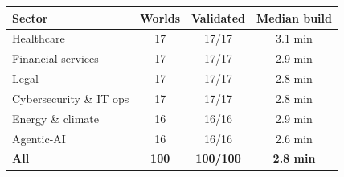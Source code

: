 \begin{tabular}{lccc}
\toprule
Sector & Worlds & Validated & Median build \\
\midrule
Healthcare & 17 & 17/17 & 3.1 min \\
Financial services & 17 & 17/17 & 2.9 min \\
Legal & 17 & 17/17 & 2.8 min \\
Cybersecurity \& IT ops & 17 & 17/17 & 2.8 min \\
Energy \& climate & 16 & 16/16 & 2.9 min \\
Agentic-AI & 16 & 16/16 & 2.6 min \\
\midrule
\textbf{All} & \textbf{100} & \textbf{100/100} & \textbf{2.8 min} \\
\bottomrule
\end{tabular}
